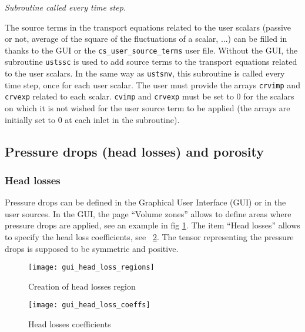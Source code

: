 {{{\noindent
\textit{Subroutine called every time step.}

The source terms in the transport equations related to the user scalars
(passive or not, average of the square of the fluctuations of a scalar, ...)
can be filled in thanks to the GUI or the \texttt{cs\_user\_source\_terms} user file.
Without the GUI, the subroutine \texttt{ustssc} is used to add source terms to the
transport equations related to the user scalars. In the same way as
\texttt{ustsnv}, this subroutine is called every time step, once for
each user scalar. The user must provide the arrays \texttt{crvimp}
and \texttt{crvexp} related to each scalar. \texttt{cvimp} and \texttt{crvexp}
must be set to 0 for the scalars on which it is not wished for the user source
term to be applied (the arrays are initially set to 0 at each inlet in the subroutine).

\subsection{Pressure drops (head losses) and porosity}
\label{sec:prg_headlosses}

\subsubsection{Head losses}

Pressure drops can be defined in the Graphical User Interface (GUI) or in the user sources. In the GUI, the page ``Volume zones'' allows to define areas where pressure drops are applied, see an example in fig \ref{fig:hl1}. The item ``Head losses'' allows to specify the head loss coefficients, see \figurename~\ref{fig:hl2}. The tensor representing the pressure drops is supposed to be symmetric
and positive.

\begin{figure}[!ht]
\begin{center}
\texttt{[image: gui\_head\_loss\_regions]}
\caption{Creation of head losses region}
\label{fig:hl1}
\end{center}
\end{figure}
%
\begin{figure}[!ht]
\begin{center}
\texttt{[image: gui\_head\_loss\_coeffs]}
\caption{Head losses coefficients}
\label{fig:hl2}
\end{center}
\end{figure}

}}}
